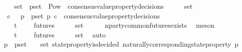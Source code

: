 \begin{isabellebody}
\ \ \ {\isachardoublequoteopen}{\isasymsigma}\ {\isasymin}\ {\isasymsigma}{\isacharunderscore}set\ {\isasymand}\ p{\isacharunderscore}set\ {\isasymin}\ Pow\ {\isacharparenleft}{\isasymUnion}\ {\isacharbraceleft}consensus{\isacharunderscore}value{\isacharunderscore}property{\isacharunderscore}decisions\ {\isasymsigma}{\isacharprime}\ {\isacharbar}\ {\isasymsigma}{\isacharprime}{\isachardot}\ {\isasymsigma}{\isacharprime}\ {\isasymin}\ {\isasymsigma}{\isacharunderscore}set{\isacharbraceright}{\isacharparenright}\ {\isacharminus}\ {\isacharbraceleft}{\isasymemptyset}{\isacharbraceright}{\isachardoublequoteclose}\isanewline
\ \ \ {\isachardoublequoteopen}{\isacharparenleft}{\isasymlambda}c{\isachardot}\ {\isasymnot}\ {\isacharparenleft}{\isasymforall}\ p\ {\isasymin}\ p{\isacharunderscore}set{\isachardot}\ p\ c{\isacharparenright}{\isacharparenright}\ {\isasymin}\ consensus{\isacharunderscore}value{\isacharunderscore}property{\isacharunderscore}decisions\ {\isasymsigma}{\isachardoublequoteclose}\isanewline
\ \ \isamarkupfalse%
\ {\isachardoublequoteopen}{\isasymexists}\ {\isasymsigma}{\isachardot}\ {\isasymsigma}\ {\isasymin}\ {\isasymSigma}t\ {\isasymand}\ {\isasymsigma}\ {\isasymin}\ {\isasymInter}\ {\isacharbraceleft}futures\ {\isasymsigma}\ {\isacharbar}\ {\isasymsigma}{\isachardot}\ {\isasymsigma}\ {\isasymin}\ {\isasymsigma}{\isacharunderscore}set{\isacharbraceright}{\isachardoublequoteclose}\isanewline
\ \ \ \ \isamarkupfalse%
\ n{\isacharunderscore}party{\isacharunderscore}common{\isacharunderscore}futures{\isacharunderscore}exists\ \isamarkupfalse%
\ meson\isanewline
\ \ \isamarkupfalse%
\ \isamarkupfalse%
\ {\isasymsigma}{\isacharprime}\ \ {\isachardoublequoteopen}{\isasymsigma}{\isacharprime}\ {\isasymin}\ {\isasymSigma}t\ {\isasymand}\ {\isasymsigma}{\isacharprime}\ {\isasymin}\ {\isasymInter}\ {\isacharbraceleft}futures\ {\isasymsigma}\ {\isacharbar}\ {\isasymsigma}{\isachardot}\ {\isasymsigma}\ {\isasymin}\ {\isasymsigma}{\isacharunderscore}set{\isacharbraceright}{\isachardoublequoteclose}\ \isamarkupfalse%
\ auto\isanewline
\ \ \isamarkupfalse%
\ {\isachardoublequoteopen}{\isasymforall}\ p\ {\isasymin}\ p{\isacharunderscore}set{\isachardot}\ {\isasymexists}\ {\isasymsigma}{\isacharprime}{\isacharprime}\ {\isasymin}\ {\isasymsigma}{\isacharunderscore}set{\isachardot}\ state{\isacharunderscore}property{\isacharunderscore}is{\isacharunderscore}decided\ {\isacharparenleft}naturally{\isacharunderscore}corresponding{\isacharunderscore}state{\isacharunderscore}property\ p{\isacharcomma}\ {\isasymsigma}{\isacharprime}{\isacharprime}{\isacharparenright}{\isachardoublequoteclose}\isanewline

\end{isabellebody}

